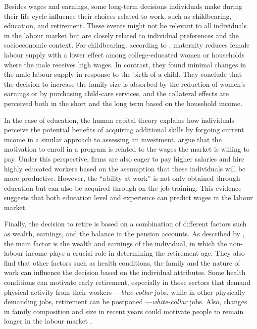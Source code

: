 Besides wages and earnings, some long-term decisions individuals make during their life cycle influence their choices related to work, such as childbearing, education, and retirement. These events might not be relevant to all individuals in the labour market but are closely related to individual preferences and the socioeconomic context. For childbearing, according to \citet{Angrist1998}, maternity reduces female labour supply with a lower effect among college-educated women or households where the male receives high wages. In contrast, they found minimal changes in the male labour supply in response to the birth of a child. They conclude that the decision to increase the family size is absorbed by the reduction of women's earnings or by purchasing child-care services, and the collateral effects are perceived both in the short and the long term based on the household income. 

In the case of education, the human capital theory explains how individuals perceive the potential benefits of acquiring additional skills by forgoing current income in a similar approach to assessing an investment. \citet{Benjamin2021} argue that the motivation to enroll in a program is related to the wages the market is willing to pay. Under this perspective, firms are also eager to pay higher salaries and hire highly educated workers based on the assumption that these individuals will be more productive. However, the “ability at work” is not only obtained through education but can also be acquired through on-the-job training. This evidence suggests that both education level and experience can predict wages in the labour market. 

Finally, the decision to retire is based on a combination of different factors such as wealth, earnings, and the balance in the pension accounts. As described by \citet{Benjamin2021}, the main factor is the wealth and earnings of the individual, in which the non-labour income plays a crucial role in determining the retirement age. They also find that other factors such as health conditions, the family and the nature of work can influence the decision based on the individual attributes. Some health conditions can motivate early retirement, especially in those sectors that demand physical activity from their workers —\textit{blue-collar} jobs, while in other physically demanding jobs, retirement can be postponed —\textit{white-collar} jobs. Also, changes in family composition and size in recent years could motivate people to remain longer in the labour market \citep{Baker1999}.

